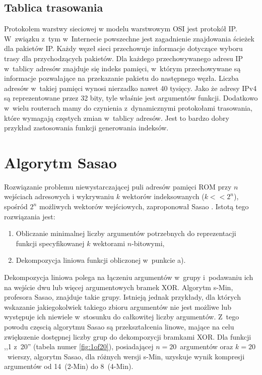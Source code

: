 \subsection{Tablica trasowania}
Protokołem warstwy sieciowej w modelu warstwowym OSI jest protokół IP.
W~związku z~tym w~Internecie powszechne jest zagadnienie znajdowania ścieżek dla pakietów IP.
Każdy węzeł sieci przechowuje informacje dotyczące wyboru trasy dla przychodzących pakietów.
Dla każdego przechowywanego adresu IP w~tablicy adresów znajduje się indeks pamięci,
w~którym przechowywane są informacje pozwalające na przekazanie pakietu do następnego węzła.
Liczba adresów w~takiej pamięci wynosi nierzadko nawet 40 tysięcy.
Jako że adresy IPv4 są reprezentowane przez 32 bity, tyle właśnie jest argumentów funkcji.
Dodatkowo w~wielu routerach mamy do czynienia z~dynamicznymi protokołami trasowania,
które wymagają częstych zmian w~tablicy adresów.
Jest to bardzo dobry przykład zastosowania funkcji generowania indeksów.

\section{Algorytm Sasao}
Rozwiązanie problemu niewystarczającej puli adresów pamięci ROM przy $n$ wejściach adresowych i wykrywaniu $k$ wektorów indeksowanych ($k<<2^n$),
spośród $2^n$ możliwych wektorów wejściowych,
zaproponował Sasao \cite{sasao-workshop, sasao-recent, sasao-s-min, sasao-synthesis}.
Istotą tego rozwiązania jest:
\begin{enumerate}[label=\alph*)]
\item Obliczanie minimalnej liczby argumentów potrzebnych do reprezentacji funkcji specyfikowanej $k$ wektorami $n$-bitowymi,
\item Dekompozycja liniowa funkcji obliczonej w~punkcie a).
\end{enumerate}

Dekompozycja liniowa polega na łączeniu argumentów w~grupy i~podawaniu ich na wejście dwu lub więcej argumentowych bramek XOR.
Algorytm s-Min, profesora Sasao, znajduje takie grupy.
Istnieją jednak przykłady,
dla których wskazanie jakiegokolwiek takiego zbioru argumentów nie jest możliwe lub występuje ich niewiele w~stosunku do całkowitej liczby argumentów.
Z~tego powodu częscią algorytmu Sasao są przekształcenia linowe,
mające na celu zwiększenie dostępnej liczby grup do dekompozycji bramkami XOR.
Dla funkcji ,,1 z~20'' (tabela numer \ref{fig:1of20}),
posiadającej $n=20$~argumentów oraz $k=20$~wierszy,
algorytm Sasao,
dla różnych wersji s-Min,
uzyskuje wynik kompresji argumentów od 14~(2-Min) do 8~(4-Min).

